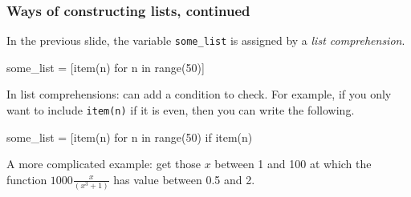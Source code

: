 \documentclass{beamer}
\newenvironment{codeblock}
    {\hfill\begin{beamerboxesrounded}[lower=codecol, width=0.8\textwidth]
    \medskip

    }
    { 
    \end{beamerboxesrounded}\hfill
    }
\theoremstyle{example}
\newcommand{\ct}[1]{\lstinline[language=Python]!#1!}
\newcommand{\ttt}[1]{{\small\texttt{#1}}}
\begin{document}
\begin{frame}[fragile]
\frametitle{Ways of constructing lists, continued}
In the previous slide, the variable \ttt{some}\ct{_}\ttt{list} is assigned by a \emph{list comprehension}.

\begin{codeblock}

\begin{python}[numbers=none]
some_list = [item(n) for n in range(50)]
\end{python}

\end{codeblock}

\pause
In list comprehensions: can add a condition to check. For example, if you only want to include \ttt{item(n)} if it is even, then you can write the following.

\begin{codeblock}

\begin{python}[numbers=none]
some_list = [item(n) for n in range(50) if item(n) %
\end{python}

\end{codeblock}

\pause
\vfill
A more complicated example: get those $x$ between 1 and 100 at which the function $1000\frac{x}{(x^3+1)}$ has value between 0.5 and 2.

\begin{codeblock}

\begin{python}
\end{python}

\end{codeblock}

\end{frame}
\end{document}

